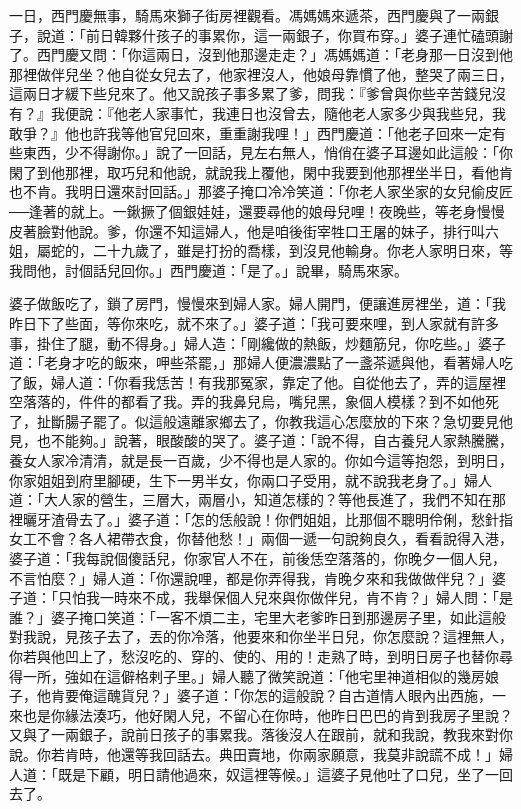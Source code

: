 一日，西門慶無事，騎馬來獅子街房裡觀看。馮媽媽來遞茶，西門慶與了一兩銀子，說道：「前日韓夥什孩子的事累你，這一兩銀子，你買布穿。」婆子連忙磕頭謝了。西門慶又問：「你這兩日，沒到他那邊走走？」馮媽媽道：「老身那一日沒到他那裡做伴兒坐？他自從女兒去了，他家裡沒人，他娘母靠慣了他，整哭了兩三日，這兩日才緩下些兒來了。他又說孩子事多累了爹，問我：『爹曾與你些辛苦錢兒沒有？』我便說：『他老人家事忙，我連日也沒曾去，隨他老人家多少與我些兒，我敢爭？』他也許我等他官兒回來，重重謝我哩！」西門慶道：「他老子回來一定有些東西，少不得謝你。」說了一回話，見左右無人，悄俏在婆子耳邊如此這般：「你閑了到他那裡，取巧兒和他說，就說我上覆他，閑中我要到他那裡坐半日，看他肯也不肯。我明日還來討回話。」那婆子掩口冷冷笑道：「你老人家坐家的女兒偷皮匠──逢著的就上。一鍬撅了個銀娃娃，還要尋他的娘母兒哩！夜晚些，等老身慢慢皮著臉對他說。爹，你還不知這婦人，他是咱後街宰牲口王屠的妹子，排行叫六姐，屬蛇的，二十九歲了，雖是打扮的喬樣，到沒見他輸身。你老人家明日來，等我問他，討個話兒回你。」西門慶道：「是了。」說畢，騎馬來家。

婆子做飯吃了，鎖了房門，慢慢來到婦人家。婦人開門，便讓進房裡坐，道：「我昨日下了些面，等你來吃，就不來了。」婆子道：「我可要來哩，到人家就有許多事，掛住了腿，動不得身。」婦人造：「剛纔做的熱飯，炒麵筋兒，你吃些。」婆子道：「老身才吃的飯來，呷些茶罷，」那婦人便濃濃點了一盞茶遞與他，看著婦人吃了飯，婦人道：「你看我恁苦！有我那冤家，靠定了他。自從他去了，弄的這屋裡空落落的，件件的都看了我。弄的我鼻兒烏，嘴兒黑，象個人模樣？到不如他死了，扯斷腸子罷了。似這般遠離家鄉去了，你教我這心怎麼放的下來？急切要見他見，也不能夠。」說著，眼酸酸的哭了。婆子道：「說不得，自古養兒人家熱騰騰，養女人家冷清清，就是長一百歲，少不得也是人家的。你如今這等抱怨，到明日，你家姐姐到府里腳硬，生下一男半女，你兩口子受用，就不說我老身了。」婦人道：「大人家的營生，三層大，兩層小，知道怎樣的？等他長進了，我們不知在那裡曬牙渣骨去了。」婆子道：「怎的恁般說！你們姐姐，比那個不聰明伶俐，愁針指女工不會？各人裙帶衣食，你替他愁！」兩個一遞一句說夠良久，看看說得入港，婆子道：「我每說個傻話兒，你家官人不在，前後恁空落落的，你晚夕一個人兒，不言怕麼？」婦人道：「你還說哩，都是你弄得我，肯晚夕來和我做做伴兒？」婆子道：「只怕我一時來不成，我舉保個人兒來與你做伴兒，肯不肯？」婦人問：「是誰？」婆子掩口笑道：「一客不煩二主，宅里大老爹昨日到那邊房子里，如此這般對我說，見孩子去了，丟的你冷落，他要來和你坐半日兒，你怎麼說？這裡無人，你若與他凹上了，愁沒吃的、穿的、使的、用的！走熟了時，到明日房子也替你尋得一所，強如在這僻格剌子里。」婦人聽了微笑說道：「他宅里神道相似的幾房娘子，他肯要俺這醜貨兒？」婆子道：「你怎的這般說？自古道情人眼內出西施，一來也是你緣法湊巧，他好閑人兒，不留心在你時，他昨日巴巴的肯到我房子里說？又與了一兩銀子，說前日孩子的事累我。落後沒人在跟前，就和我說，教我來對你說。你若肯時，他還等我回話去。典田賣地，你兩家願意，我莫非說謊不成！」婦人道：「既是下顧，明日請他過來，奴這裡等候。」這婆子見他吐了口兒，坐了一回去了。

